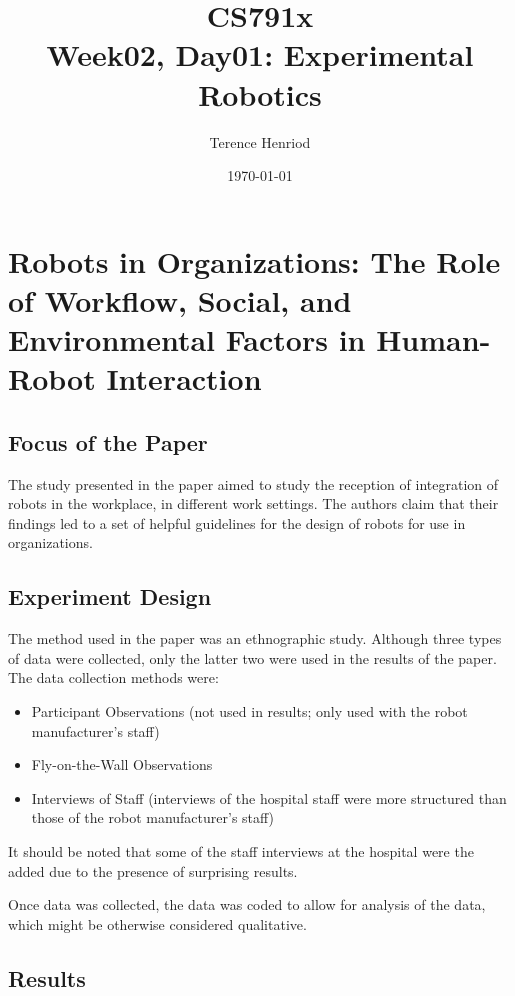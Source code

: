 \documentclass{article}
\title{CS791x \\ Week02, Day01: Experimental Robotics}
\author{Terence Henriod}
\date{\today}
\begin{document}
\maketitle



\newpage
\section{Robots in Organizations: The Role of Workflow, Social, and Environmental Factors in Human-Robot Interaction}

\subsection{Focus of the Paper}
The study presented in the paper aimed to study the reception of integration of robots in the workplace, in different work settings. The authors claim that their findings led to a set of helpful guidelines for the design of robots for use in organizations.

\subsection{Experiment Design}
The method used in the paper was an ethnographic study. Although three types of data were collected, only the latter two were used in the results of the paper. The data collection methods were:
\begin{itemize}
  \item Participant Observations (not used in results; only used with the robot manufacturer's staff)
  \item Fly-on-the-Wall Observations
  \item Interviews of Staff (interviews of the hospital staff were more structured than those of the robot manufacturer's staff)
\end{itemize}

It should be noted that some of the staff interviews at the hospital were the added due to the presence of surprising results.

Once data was collected, the data was coded to allow for analysis of the data, which might be otherwise considered qualitative.

\subsection{Results}
\end{document}
